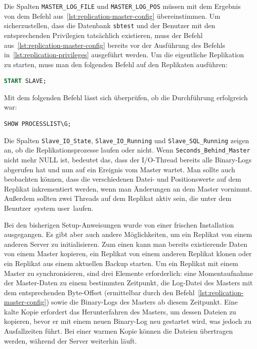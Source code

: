 Die Spalten \texttt{MASTER\_LOG\_FILE} und \texttt{MASTER\_LOG\_POS} müssen mit dem Ergebnis von dem Befehl aus~\ref{lst:replication-master-config} übereinstimmen.
Um sicherzustellen, dass die Datenbank \texttt{sbtest} und der Benutzer mit den entsprechenden Privilegien tatsächlich existieren, muss der Befehl aus~\ref{lst:replication-master-config} bereits vor der Ausführung des Befehls in~\ref{lst:replication-privileges} ausgeführt werden.
Um die eigentliche Replikation zu starten, muss man den folgenden Befehl auf den Replikaten ausführen:

\vspace{-8pt}
\begin{lstlisting}[language=SQL,caption=Starten der Replikation,label={lst:replication-replica-start}]
START SLAVE;
\end{lstlisting}
\vspace{-5pt}

Mit dem folgenden Befehl lässt sich überprüfen, ob die Durchführung erfolgreich war:

\vspace{-8pt}
\begin{lstlisting}[language=SQL,caption=Status des Replikats,label={lst:replication-replica-status}]
SHOW PROCESSLIST\G;
\end{lstlisting}
\vspace{-5pt}

Die Spalten \texttt{Slave\_IO\_State}, \texttt{Slave\_IO\_Running} und \texttt{Slave\_SQL\_Running} zeigen an, ob die Replikationsprozesse laufen oder nicht.
Wenn \texttt{Seconds\_Behind\_Master} nicht mehr NULL ist, bedeutet das, dass der I/O-Thread bereits alle Binary-Logs abgerufen hat und nun auf ein Ereignis vom Master wartet.
Man sollte auch beobachten können, dass die verschiedenen Datei- und Positionswerte auf dem Replikat inkrementiert werden, wenn man Änderungen an dem Master vornimmt.
Außerdem sollten zwei Threads auf dem Replikat aktiv sein, die unter dem Benutzer~\glqq system user\grqq~laufen.

Bei den bisherigen Setup-Anweisungen wurde von einer frischen Installation ausgegangen.
Es gibt aber auch andere Möglichkeiten, um ein Replikat von einem anderen Server zu initialisieren.
Zum einen kann man bereits existierende Daten von einem Master kopieren, ein Replikat von einem anderen Replikat klonen oder ein Replikat aus einem aktuellen Backup starten.
Um ein Replikat mit einem Master zu synchronisieren, sind drei Elemente erforderlich: eine Momentaufnahme der Master-Daten zu einem bestimmten Zeitpunkt, die Log-Datei des Masters mit dem entsprechenden Byte-Offset (ermittelbar durch den Befehl~\ref{lst:replication-master-config}) sowie die Binary-Logs des Masters ab diesem Zeitpunkt.
Eine kalte Kopie erfordert das Herunterfahren des Masters, um dessen Dateien zu kopieren, bevor er mit einem neuen Binary-Log neu gestartet wird, was jedoch zu Ausfallzeiten führt.
Bei einer warmen Kopie können die Dateien übertragen werden, während der Server weiterhin läuft.

